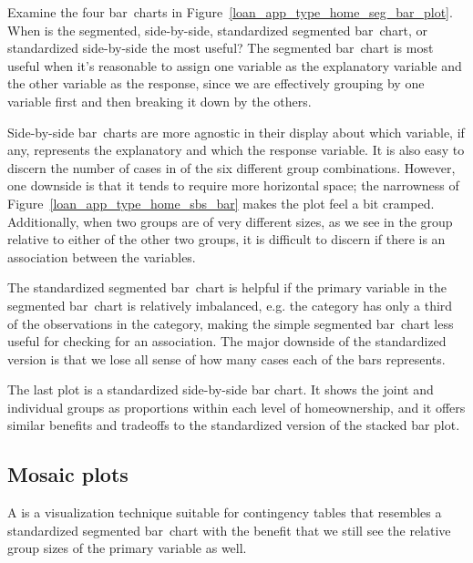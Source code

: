 \begin{examplewrap}
\begin{nexample}{Examine the four bar~charts in
    Figure~\ref{loan_app_type_home_seg_bar_plot}.
    When is the segmented, side-by-side, standardized
    segmented bar~chart, or standardized side-by-side the most useful?}
  The segmented bar~chart is most useful when it's reasonable
  to assign one variable as the explanatory variable and
  the other variable as the response, since we are effectively
  grouping by one variable first and then breaking it down by
  the others.

  Side-by-side bar~charts are more agnostic in their display
  about which variable, if any, represents the explanatory
  and which the response variable.
  It is also easy to discern the number of cases
  in of the six different group combinations.
  However, one downside
  is that it tends to require more horizontal space;
  the narrowness of Figure~\ref{loan_app_type_home_sbs_bar}
  makes the plot feel a bit cramped.
  Additionally, when two groups are of very different sizes,
  as we see in the  group relative to either of the
  other two groups,
  it is difficult to discern if there is an association
  between the variables.

  The standardized segmented bar~chart is helpful if the primary
  variable in the segmented bar~chart is relatively imbalanced,
  e.g. the  category has only a third of the
  observations in the  category,
  making the simple segmented bar~chart less useful for
  checking for an association.
  The major downside of the standardized version
  is that we lose all sense of how many cases each of the
  bars represents.

The last plot is a standardized side-by-side bar chart. It shows the joint and individual groups as proportions within each level of homeownership, and it offers similar benefits and tradeoffs to the standardized version of the stacked bar plot.
\end{nexample}
\end{examplewrap}

\newpage
\subsection{Mosaic plots}
\label{mosaic_plots_subsection}

A  is a visualization technique
suitable for contingency tables that resembles
a standardized segmented bar~chart with the benefit
that we still see the relative group sizes of the
primary variable as well.

